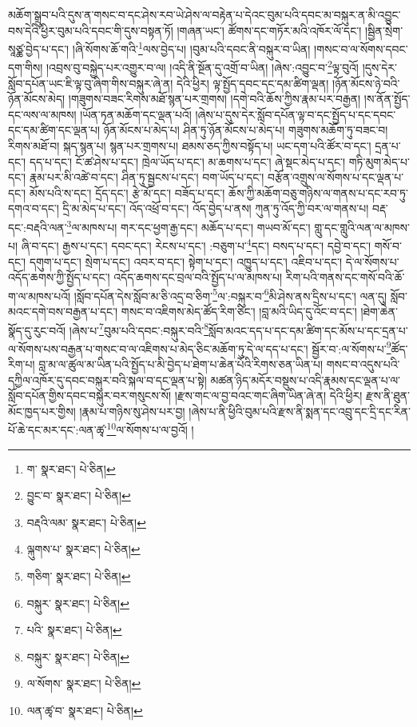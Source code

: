 མཆོག་སྒྲུབ་པའི་དུས་ན་གསང་བ་དང་ཤེས་རབ་ཡེ་ཤེས་ལ་བརྟེན་པ་དེའང་བུམ་པའི་དབང་མ་བསྐུར་ན་མི་འབྱུང་བས་དེའི་ཕྱིར་བུམ་པའི་དབང་གི་དུས་བསྟན་ཏོ། །གཞན་ཡང་། ཚོགས་དང་གཏོར་མའི་འཁོར་ལོ་དང་། །སྦྱིན་སྲེག་སཱཙྪ་བྱེད་པ་དང་། །ཞི་སོགས་ཆོ་གའི་\footnote{ག་  སྣར་ཐང་།  པེ་ཅིན། }ལས་བྱེད་པ། །བུམ་པའི་དབང་ནི་བསྐུར་བ་ཡིན། །གསང་བ་ལ་སོགས་དབང་དག་གིས། །འབྲས་བུ་བསྐྱེད་པར་འགྱུར་བ་ལ། །འདི་ནི་སྔོན་དུ་འགྲོ་བ་ཡིན། །ཞེས་:འབྱུང་བ་\footnote{བྱུང་བ་  སྣར་ཐང་།  པེ་ཅིན། }ལྟ་བུའོ། །དུས་དེར་སློབ་དཔོན་ཡང་ཇི་ལྟ་བུ་ཞིག་གིས་བསྐུར་ཞེ་ན། དེའི་ཕྱིར། ལྟ་སྤྱོད་དབང་དང་དམ་ཚིག་ལྡན། །ཉོན་མོངས་ཉེ་བའི་ཉོན་མོངས་མེད། །གཟུགས་བཟང་རིགས་མཐོ་སྙན་པར་གྲགས། །དགེ་བའི་ཆོས་ཀྱིས་རྣམ་པར་བརྒྱན། །ས་ནོན་སྤྱོད་དང་ལས་ལ་མཁས། །ཡོན་ཏན་མཆོག་དང་ལྡན་པའོ། །ཞེས་པ་དུས་དེར་སློབ་དཔོན་ལྟ་བ་དང་སྤྱོད་པ་དང་དབང་དང་དམ་ཚིག་དང་ལྡན་པ། ཉོན་མོངས་པ་མེད་པ། ཤིན་ཏུ་ཉོན་མོངས་པ་མེད་པ། གཟུགས་མཆོག་ཏུ་བཟང་བ། རིགས་མཐོ་བ། སྐད་སྙན་པ། སྙན་པར་གྲགས་པ། ཐམས་ཅད་ཀྱིས་བསྟོད་པ། ཡང་དག་པའི་ཚོར་བ་དང་། དྲན་པ་དང་། དད་པ་དང་། ངོ་ཚ་ཤེས་པ་དང་། ཁྲེལ་ཡོད་པ་དང་། མ་ཆགས་པ་དང་། ཞེ་སྡང་མེད་པ་དང་། གཏི་མུག་མེད་པ་དང་། རྣམ་པར་མི་འཚེ་བ་དང་། ཤིན་ཏུ་སྦྱངས་པ་དང་། བག་ཡོད་པ་དང་། བརྩོན་འགྲུས་ལ་སོགས་པ་དང་ལྡན་པ་དང་། མོས་པའི་ས་དང་། དྲོད་དང་། རྩེ་མོ་དང་། བཟོད་པ་དང་། ཆོས་ཀྱི་མཆོག་བཅུ་གཉིས་ལ་གནས་པ་དང་རབ་ཏུ་དགའ་བ་དང་། དྲི་མ་མེད་པ་དང་། འོད་འཕྲོ་བ་དང་། འོད་བྱེད་པ་ནས། ཀུན་ཏུ་འོད་ཀྱི་བར་ལ་གནས་པ། བརྡ་དང་:བརྡའི་ལན་\footnote{བརྡའི་ལམ་  སྣར་ཐང་།  པེ་ཅིན། }ལ་མཁས་པ། གར་དང་ཕྱག་རྒྱ་དང་། མཆོད་པ་དང་། གཡབ་མོ་དང་། གླུ་དང་གླུའི་ལན་ལ་མཁས་པ། ཞི་བ་དང་། རྒྱས་པ་དང་། དབང་དང་། རེངས་པ་དང་། :བཅུག་པ་\footnote{ལྐུགས་པ་  སྣར་ཐང་།  པེ་ཅིན། }དང་། བསད་པ་དང་། དབྱེ་བ་དང་། གསོ་བ་དང་། དགུག་པ་དང་། སྲེག་པ་དང་། འབར་བ་དང་། སྟེག་པ་དང་། འཁྱུད་པ་དང་། འཇིབ་པ་དང་། དེ་ལ་སོགས་པ་འདོད་ཆགས་ཀྱི་སྤྱོད་པ་དང་། འདོད་ཆགས་དང་བྲལ་བའི་སྤྱོད་པ་ལ་མཁས་པ། རིག་པའི་གནས་དང་གསོ་བའི་ཆོ་ག་ལ་མཁས་པའོ། །སློབ་དཔོན་དེས་སློབ་མ་ཅི་འདྲ་བ་ཅིག་\footnote{གཅིག་  སྣར་ཐང་།  པེ་ཅིན། }ལ་:བསྐུར་བ་\footnote{བསྐུར་  སྣར་ཐང་།  པེ་ཅིན། }མི་ཤེས་ནས་དྲིས་པ་དང་། ལན་དུ། སློབ་མའང་དགེ་བས་བརྒྱན་པ་དང་། གསང་བ་འཇིགས་མེད་ཚོད་རིག་ཅིང་། །བླ་མའི་ཡིད་དུ་འོང་བ་དང་། །ཐེག་ཆེན་སྣོད་དུ་རུང་བའོ། །ཞེས་པ་\footnote{པའི་  སྣར་ཐང་།  པེ་ཅིན། }བུམ་པའི་དབང་:བསྐུར་བའི་\footnote{བསྐུར་  སྣར་ཐང་།  པེ་ཅིན། }སློབ་མའང་དད་པ་དང་དམ་ཚིག་དང་མོས་པ་དང་དྲན་པ་ལ་སོགས་པས་བརྒྱན་པ་གསང་བ་ལ་འཇིགས་པ་མེད་ཅིང་མཆོག་ཏུ་དེ་ལ་དད་པ་དང་། སྦྱོར་བ་:ལ་སོགས་པ་\footnote{ལ་སོགས་  སྣར་ཐང་།  པེ་ཅིན། }ཚོད་རིག་པ། བླ་མ་ལ་ཚུལ་མ་ཡིན་པའི་སྤྱོད་པ་མི་བྱེད་པ་ཐེག་པ་ཆེན་པོའི་རིགས་ཅན་ཡིན་པ། གསང་བ་འདུས་པའི་དཀྱིལ་འཁོར་དུ་དབང་བསྐུར་བའི་སྐལ་བ་དང་ལྡན་པ་སྟེ། མཚན་ཉིད་མདོར་བསྡུས་པ་འདི་རྣམས་དང་ལྡན་པ་ལ་སློབ་དཔོན་གྱིས་དབང་བསྐུར་བར་གསུངས་སོ། །རྫས་གང་ལ་བྱ་བའང་གང་ཞིག་ཡིན་ཞེ་ན། དེའི་ཕྱིར། རྫས་ནི་ཐུན་མོང་ཁྱད་པར་གྱིས། །རྣམ་པ་གཉིས་སུ་ཤེས་པར་བྱ། །ཞེས་པ་ནི་ཕྱིའི་བུམ་པའི་རྫས་ནི་སྨན་དང་འབྲུ་དང་དྲི་དང་རིན་པོ་ཆེ་དང་མར་དང་:ལན་ཚྭ་\footnote{ལན་ཚྭ་བ་  སྣར་ཐང་།  པེ་ཅིན། }ལ་སོགས་པ་ལ་བྱའོ། །
